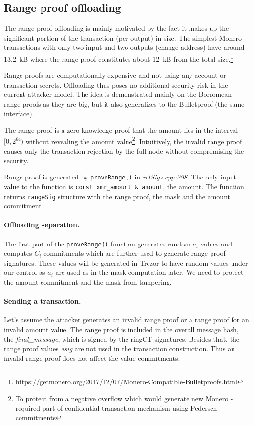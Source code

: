 \documentclass[]{article}
\begin{document}
\subsection{Range proof offloading}
The range proof offloading is mainly motivated by the fact it makes up the significant portion of the transaction (per output) in size. The simplest Monero transactions with only two input and two outputs (change address) have around 
13.2~kB where the range proof constitutes about 12~kB from the total size.\footnote{\url{https://getmonero.org/2017/12/07/Monero-Compatible-Bulletproofs.html}}
 
Range proofs are computationally expensive and not using any account or transaction secrets. Offloading thus poses no additional security risk in the current attacker model. The idea is demonstrated mainly on the Borromean range proofs as they are big, but it also generalizes to the Bulletproof (the same interface). 

The range proof is a zero-knowledge proof that the amount lies in the interval $[0, 2^{64})$ without revealing the amount value\footnote{To protect from a negative overflow which would generate new Monero - required part of confidential transaction mechanism using Pedersen commitments}. Intuitively, the invalid range proof causes only the transaction rejection by the full node without compromising the security.

Range proof is generated by \verb|proveRange()| in \emph{rctSigs.cpp:298}. The only input value to the function is \verb|const xmr_amount & amount|, the amount. The function returns \verb|rangeSig| structure with the range proof, the mask and the amount commitment. 

\paragraph{Offloading separation.}
The first part of the \verb|proveRange()| function generates random $a_i$ values and computes $C_i$ commitments which are further used to generate range proof signatures. These values will be generated in Trezor to have random values under our control as $a_i$ are used as in the mask computation later. We need to protect the amount commitment and the mask from tampering.

\paragraph{Sending a transaction.}
Let's assume the attacker generates an invalid range proof or a range proof for an invalid amount value. The range proof is included in the overall message hash, the \emph{final\_message}, which is signed by the ringCT signatures. Besides that, the range proof values \emph{asig} are not used in the transaction construction. Thus an invalid range proof does not affect the value commitments. 
\end{document}
